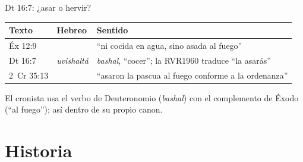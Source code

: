 \begin{frame}{Dt 16:7: ¿asar o hervir?}
\centering{}\par\smallskip
\scriptsize\renewcommand{\arraystretch}{1.18}
\begin{tabular}{@{}L{2.0cm}L{4.6cm}L{5.5cm}@{}}
\toprule
\textbf{Texto} & \textbf{Hebreo} & \textbf{Sentido} \\ \midrule
Éx 12:9 &  & ``ni cocida en agua, sino asada al fuego'' \\
Dt 16:7 &  \emph{uvishaltá} & \emph{bashal}, ``cocer''; la RVR1960 traduce ``la asarás'' \\
2~Cr 35:13 &  & ``asaron la pascua al fuego conforme a la ordenanza'' \\
\bottomrule
\end{tabular}\par\medskip
\small\RaggedRight El cronista usa el verbo de Deuteronomio (\emph{bashal}) con el complemento de Éxodo (``al fuego''); así  dentro de su propio canon.\par\smallskip
{}
\end{frame}

\section{Historia}

